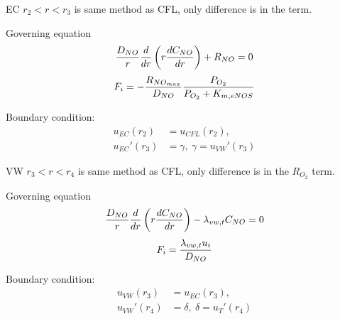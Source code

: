 \documentclass[8pt, a4paper]{article}
\begin{document}
  EC $r_2<r<r_3$ is same method as CFL, only difference is in the \RNO term.
  
  Governing equation
  \begin{equation*}
  \frac{D_{NO}}{r}\frac{d}{dr}\left(r\frac{dC_{NO}}{dr}\right)+R_{NO}=0
  \end{equation*}
  \begin{equation*}
  F_i=-\frac{R_{NO_{max}}}{D_{NO}}\frac{P_{O_2}}{P_{O_2}+K_{m,eNOS}}
  \end{equation*}
  
  Boundary condition:
  \begin{align*}
  u_{EC}(r_2)&=u_{CFL}(r_2),\\
  u_{EC}'(r_3)&=\gamma,\:\gamma=u_{VW}'(r_3)
  \end{align*}
  
  VW $r_3<r<r_4$ is same method as CFL, only difference is in the $R_{O_2}$ 
  term.
  
  Governing equation
  \begin{equation*}
  \frac{D_{NO}}{r}\frac{d}{dr}\left(r\frac{dC_{NO}}{dr}\right)-\lambda_{vw,t}C_{NO}=0
  \end{equation*}
  \begin{equation*}
  F_i=\frac{\lambda_{vw,t}u_i}{D_{NO}}
  \end{equation*}
  
  Boundary condition:
  \begin{align*}
  u_{VW}(r_3)&=u_{EC}(r_3),\\
  u_{VW}'(r_4)&=\delta,\:\delta=u_{T}'(r_4)
  \end{align*}
\end{document}
